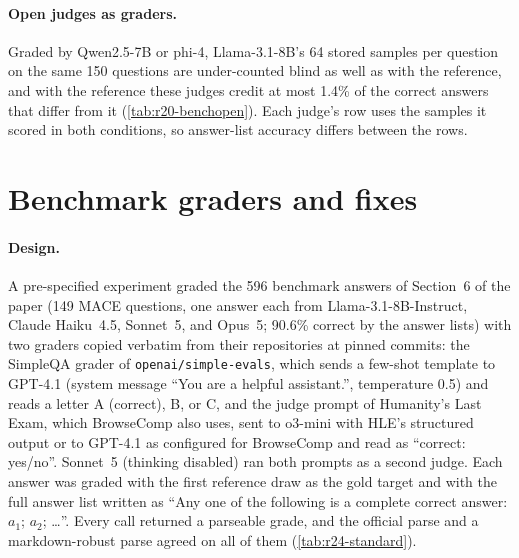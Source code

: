 \paragraph{Open judges as graders.}
Graded by Qwen2.5-7B or phi-4, Llama-3.1-8B's 64 stored samples per question on the same 150 questions are under-counted blind as well as with the reference, and with the reference these judges credit at most 1.4\% of the correct answers that differ from it (\cref{tab:r20-benchopen}).\ph{} Each judge's row uses the samples it scored in both conditions, so answer-list accuracy differs between the rows.

\begin{table}[htbp]
\centering
\caption{Open judges as graders of Llama-3.1-8B's stored samples on the 150 multi-answer \textsc{MACE} questions (a score of 7 or above counts as correct; question-level bootstrap).\ph}
\label{tab:r20-benchopen}
\footnotesize

\end{table}

\FloatBarrier
\section{Benchmark graders and fixes}
\label{app:r24}

\paragraph{Design.} A pre-specified experiment graded the 596 benchmark answers of Section~6 of the paper (149 \textsc{MACE} questions, one answer each from Llama-3.1-8B-Instruct, Claude Haiku~4.5, Sonnet~5, and Opus~5; 90.6\% correct by the answer lists) with two graders copied verbatim from their repositories at pinned commits: the SimpleQA grader of \texttt{openai/simple-evals}, which sends a few-shot template to GPT-4.1 (system message ``You are a helpful assistant.'', temperature 0.5) and reads a letter A (correct), B, or C, and the judge prompt of Humanity's Last Exam, which BrowseComp also uses, sent to o3-mini with HLE's structured output or to GPT-4.1 as configured for BrowseComp and read as ``correct: yes/no''. Sonnet~5 (thinking disabled) ran both prompts as a second judge. Each answer was graded with the first reference draw as the gold target and with the full answer list written as ``Any one of the following is a complete correct answer: $a_1$; $a_2$; \dots''. Every call returned a parseable grade, and the official parse and a markdown-robust parse agreed on all of them (\cref{tab:r24-standard}).

